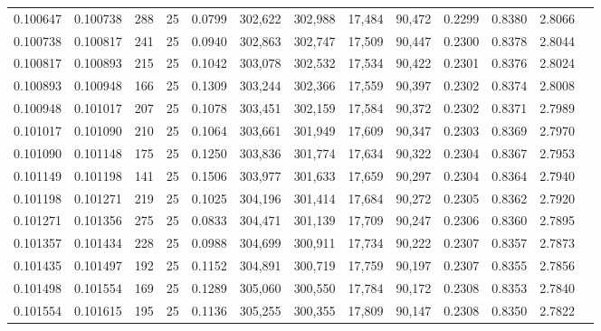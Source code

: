 \begin{tabular}{rrrrrrrrrrrrr}
0.100647 & 0.100738 &   288 &  25 &                                     0.0799 & 302,622 & 302,988 &  17,484 &  90,472 & 0.2299 & 0.8380 & 2.8066 \\
0.100738 & 0.100817 &   241 &  25 &                                     0.0940 & 302,863 & 302,747 &  17,509 &  90,447 & 0.2300 & 0.8378 & 2.8044 \\
0.100817 & 0.100893 &   215 &  25 &                                     0.1042 & 303,078 & 302,532 &  17,534 &  90,422 & 0.2301 & 0.8376 & 2.8024 \\
0.100893 & 0.100948 &   166 &  25 &                                     0.1309 & 303,244 & 302,366 &  17,559 &  90,397 & 0.2302 & 0.8374 & 2.8008 \\
0.100948 & 0.101017 &   207 &  25 &                                     0.1078 & 303,451 & 302,159 &  17,584 &  90,372 & 0.2302 & 0.8371 & 2.7989 \\
0.101017 & 0.101090 &   210 &  25 &                                     0.1064 & 303,661 & 301,949 &  17,609 &  90,347 & 0.2303 & 0.8369 & 2.7970 \\
0.101090 & 0.101148 &   175 &  25 &                                     0.1250 & 303,836 & 301,774 &  17,634 &  90,322 & 0.2304 & 0.8367 & 2.7953 \\
0.101149 & 0.101198 &   141 &  25 &                                     0.1506 & 303,977 & 301,633 &  17,659 &  90,297 & 0.2304 & 0.8364 & 2.7940 \\
0.101198 & 0.101271 &   219 &  25 &                                     0.1025 & 304,196 & 301,414 &  17,684 &  90,272 & 0.2305 & 0.8362 & 2.7920 \\
0.101271 & 0.101356 &   275 &  25 &                                     0.0833 & 304,471 & 301,139 &  17,709 &  90,247 & 0.2306 & 0.8360 & 2.7895 \\
0.101357 & 0.101434 &   228 &  25 &                                     0.0988 & 304,699 & 300,911 &  17,734 &  90,222 & 0.2307 & 0.8357 & 2.7873 \\
0.101435 & 0.101497 &   192 &  25 &                                     0.1152 & 304,891 & 300,719 &  17,759 &  90,197 & 0.2307 & 0.8355 & 2.7856 \\
0.101498 & 0.101554 &   169 &  25 &                                     0.1289 & 305,060 & 300,550 &  17,784 &  90,172 & 0.2308 & 0.8353 & 2.7840 \\
0.101554 & 0.101615 &   195 &  25 &                                     0.1136 & 305,255 & 300,355 &  17,809 &  90,147 & 0.2308 & 0.8350 & 2.7822 \\

\end{tabular}
